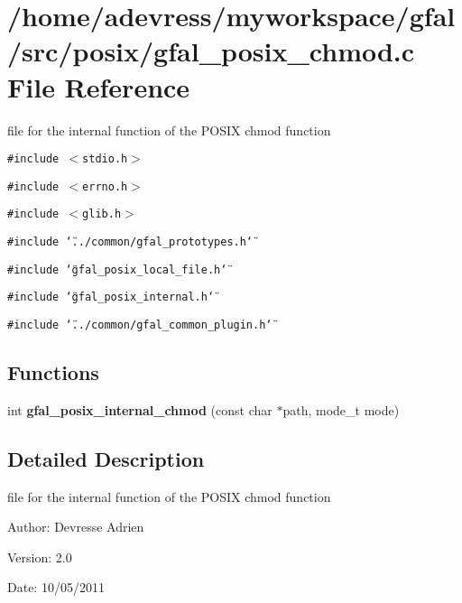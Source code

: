 \section{/home/adevress/myworkspace/gfal/src/posix/gfal\_\-posix\_\-chmod.c File Reference}
\label{gfal__posix__chmod_8c}
file for the internal function of the POSIX chmod function 

{\tt \#include $<$stdio.h$>$}\par
{\tt \#include $<$errno.h$>$}\par
{\tt \#include $<$glib.h$>$}\par
{\tt \#include \char`\"{}../common/gfal\_\-prototypes.h\char`\"{}}\par
{\tt \#include \char`\"{}gfal\_\-posix\_\-local\_\-file.h\char`\"{}}\par
{\tt \#include \char`\"{}gfal\_\-posix\_\-internal.h\char`\"{}}\par
{\tt \#include \char`\"{}../common/gfal\_\-common\_\-plugin.h\char`\"{}}\par
\subsection*{Functions}
\begin{CompactItemize}
\item 
int \textbf{gfal\_\-posix\_\-internal\_\-chmod} (const char $\ast$path, mode\_\-t mode)\label{gfal__posix__chmod_8c_e0273008201a878710ad033d08258810}

\end{CompactItemize}


\subsection{Detailed Description}
file for the internal function of the POSIX chmod function 

\begin{Desc}
\item[Author:]Devresse Adrien \end{Desc}
\begin{Desc}
\item[Version:]2.0 \end{Desc}
\begin{Desc}
\item[Date:]10/05/2011 \end{Desc}
